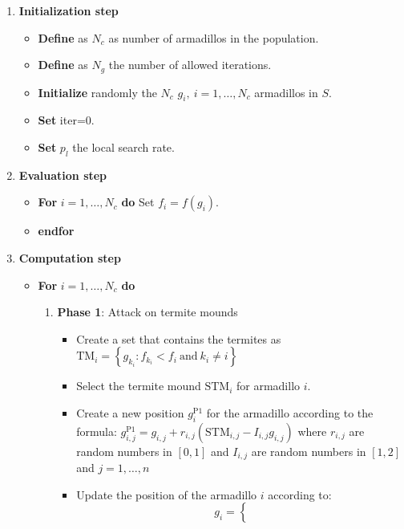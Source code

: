 \documentclass[journal,article,submit,pdftex,moreauthors]{Definitions/mdpi}
\begin{document}
\begin{enumerate}
   
\item \textbf{Initialization step}
\begin{itemize}
    \item  \textbf{Define}  as $N_c$ as number of armadillos in the population.
    \item  \textbf{Define} as $N_g$ the  number of allowed iterations.
    \item \textbf{Initialize} randomly the $N_c$ $g_i,\ i=1,\ldots,N_c$ armadillos in $S$.
    \item \textbf{Set} iter=0.
    \item  \textbf{Set} $p_l$ the local search rate.
\end{itemize}
\item \textbf{Evaluation step}
\begin{itemize}
  \item \textbf{For} $i=1,\ldots,N_c$ \textbf{do} Set 
  $f_i=f\left(g_i\right)$.
  \item  \textbf{endfor}
\end{itemize}
\item \textbf{Computation step} \label{enu:compu}
    \begin{itemize}
        \item \textbf{For} $i=1,\ldots,N_c$ \textbf{do}
        \begin{enumerate}
            \item \textbf{Phase 1}: Attack on termite mounds 
            \begin{itemize}
                \item Create a set that contains the termites as
                $\mbox{TM}_i=\left\{g_{k_i}: f_{k_i}<f_i\  \mbox{and}\  k_i\ne i \right\}$
                \item Select the termite mound $\mbox{STM}_i$ for armadillo $i$.
                \item  Create a new position $g^{\mbox{P1}}_i$ for the armadillo according to the formula: $g^{\mbox{P1}}_{i,j}=g_{i,j}+r_{i,j}\left( \mbox{STM}_{i,j}-I_{i,j}g_{i,j}\right)$ where $r_{i,j}$ are random numbers in $[0,1]$ and $I_{i,j}$ are random numbers in $[1,2]$ and $j=1,\ldots,n$
                \item Update the position of the armadillo $i$ according to:
                \[
                g_{i}=\begin{cases}
                \begin{array}{cc}

\end{array}
\end{cases}\]
\end{itemize}
\end{enumerate}
\end{itemize}
\end{enumerate}
\end{document}
